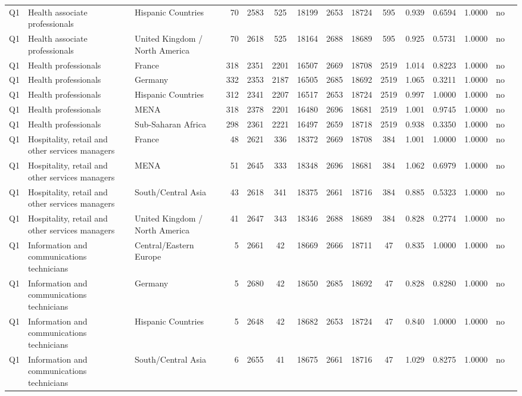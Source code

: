 \begin{longtable}{lllrcccccccccll}
Q1 & Health associate professionals & Hispanic Countries & 70 & 2583 & 525 & 18199 & 2653 & 18724 & 595 & 0.939 & 0.6594 & 1.0000 & no \\
Q1 & Health associate professionals & United Kingdom / North America & 70 & 2618 & 525 & 18164 & 2688 & 18689 & 595 & 0.925 & 0.5731 & 1.0000 & no \\
Q1 & Health professionals & France & 318 & 2351 & 2201 & 16507 & 2669 & 18708 & 2519 & 1.014 & 0.8223 & 1.0000 & no \\
Q1 & Health professionals & Germany & 332 & 2353 & 2187 & 16505 & 2685 & 18692 & 2519 & 1.065 & 0.3211 & 1.0000 & no \\
Q1 & Health professionals & Hispanic Countries & 312 & 2341 & 2207 & 16517 & 2653 & 18724 & 2519 & 0.997 & 1.0000 & 1.0000 & no \\
Q1 & Health professionals & MENA & 318 & 2378 & 2201 & 16480 & 2696 & 18681 & 2519 & 1.001 & 0.9745 & 1.0000 & no \\
Q1 & Health professionals & Sub-Saharan Africa & 298 & 2361 & 2221 & 16497 & 2659 & 18718 & 2519 & 0.938 & 0.3350 & 1.0000 & no \\
Q1 & Hospitality, retail and other services managers & France & 48 & 2621 & 336 & 18372 & 2669 & 18708 & 384 & 1.001 & 1.0000 & 1.0000 & no \\
Q1 & Hospitality, retail and other services managers & MENA & 51 & 2645 & 333 & 18348 & 2696 & 18681 & 384 & 1.062 & 0.6979 & 1.0000 & no \\
Q1 & Hospitality, retail and other services managers & South/Central Asia & 43 & 2618 & 341 & 18375 & 2661 & 18716 & 384 & 0.885 & 0.5323 & 1.0000 & no \\
Q1 & Hospitality, retail and other services managers & United Kingdom / North America & 41 & 2647 & 343 & 18346 & 2688 & 18689 & 384 & 0.828 & 0.2774 & 1.0000 & no \\
Q1 & Information and communications technicians & Central/Eastern Europe & 5 & 2661 & 42 & 18669 & 2666 & 18711 & 47 & 0.835 & 1.0000 & 1.0000 & no \\
Q1 & Information and communications technicians & Germany & 5 & 2680 & 42 & 18650 & 2685 & 18692 & 47 & 0.828 & 0.8280 & 1.0000 & no \\
Q1 & Information and communications technicians & Hispanic Countries & 5 & 2648 & 42 & 18682 & 2653 & 18724 & 47 & 0.840 & 1.0000 & 1.0000 & no \\
Q1 & Information and communications technicians & South/Central Asia & 6 & 2655 & 41 & 18675 & 2661 & 18716 & 47 & 1.029 & 0.8275 & 1.0000 & no \\

\end{longtable}
